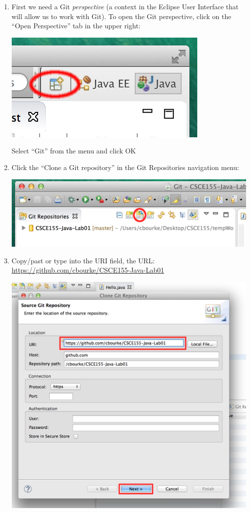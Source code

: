 \documentclass[12pt]{scrartcl}
\begin{document}
\begin{enumerate}
  \item First we need a Git \emph{perspective} (a context in the Eclipse 
    User Interface that will allow us to work with Git).  To open the 
    Git perspective, click on the ``Open Perspective'' tab in the upper right:
	\begin{center}
	\includegraphics[scale=0.50]{eclipseOpenPerspectiveMarkUp}
	\end{center}
	Select ``Git'' from the menu and click OK
  \item Click the ``Clone a Git repository'' in the Git Repositories navigation menu:
  	\begin{center}
	\includegraphics[scale=0.50]{eclipseGitRepoMarkUp}
	\end{center}
  \item Copy/past or type into the URI field, the URL: \\
  	\url{https://github.com/cbourke/CSCE155-Java-Lab01}
  	\begin{center}
	\includegraphics[scale=0.35]{eclipseCloneDialogAMarkUp}

\end{center}
\end{enumerate}
\end{document}

